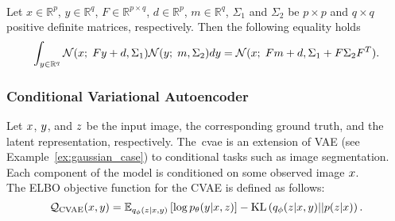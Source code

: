 \newpage
\begin{lemma}
    \textbf{\citep{rao1973linear}}\\
    \label{prop:gaussian}
    Let $x \in \mathbb{R}^p$, $y \in \mathbb{R}^q$, 
    $F \in \mathbb{R}^{p \times q}$, $d \in \mathbb{R}^p$, $m \in \mathbb{R}^q$,
    $\Sigma_1$ and $\Sigma_2$ 
    be $p\times p$ and  $q\times q $ positive definite matrices, respectively. 
    Then  the following equality holds
    \begin{equation*}
        \int_{y \in  \mathbb{R}^q} 
        \mathcal{N}(x;\; F y  + d , \Sigma_1) \mathcal{N}(y;\; m , \Sigma_2) dy 
        = \mathcal{N}(x;\; Fm + d , \Sigma_1 + F \Sigma_2 F^T)\text{.\\}
    \end{equation*}  
\end{lemma}


\vspace{0.65cm}
\subsubsection*{Conditional Variational Autoencoder}
Let $x$, $y$, and $z$ be the input image, the corresponding ground truth,
and the latent representation, respectively.
The~\gls*{cvae} is an extension of VAE 
(see Example~\ref{ex:gaussian_case})
to conditional tasks such as image segmentation. 
Each component of the model is conditioned on some observed image $x$.\\
The ELBO objective function for the CVAE is defined as follows:
\begin{equation*}
    \mathcal{Q}_{\text{CVAE}}(x,y) = 
    \mathbb{E}_{q_{\phi}(z|x,y)}\left[\log p_{\theta}(y|x,z)\right] 
    - \text{KL}\left(q_{\phi}(z|x,y)||p(z|x)\right) \text{.}
\end{equation*}